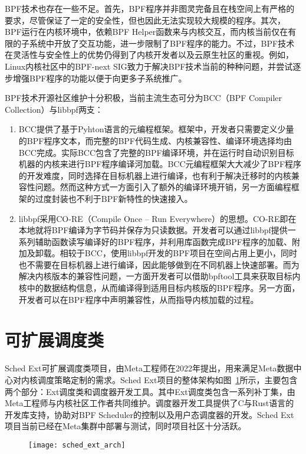 BPF技术也存在一些不足。首先，BPF程序并非图灵完备且在栈空间上有严格的要求，尽管保证了一定的安全性，但也因此无法实现较大规模的程序。其次，BPF运行在内核环境中，依赖BPF Helper函数来与内核交互，而内核当前仅在有限的子系统中开放了交互功能，进一步限制了BPF程序的能力。不过，BPF技术在灵活性与安全性上的优势仍得到了内核开发者以及云原生社区的重视。例如，Linux内核社区中的BPF-next SIG致力于解决BPF技术当前的种种问题，并尝试逐步增强BPF程序的功能以便于向更多子系统推广。

BPF技术开源社区维护十分积极，当前主流生态可分为BCC（BPF Compiler Collection）\citep{bcc}与libbpf\citep{libbpf}两支：

\begin{enumerate}
    \item BCC提供了基于Pyhton语言的元编程框架。框架中，开发者只需要定义少量的BPF程序文本，而完整的BPF代码生成、内核兼容性、编译环境选择均由BCC完成。实际BCC包含了完整的BPF编译环境，并在运行时自动识别目标机器的内核来进行BPF程序编译河加载。BCC元编程框架大大减少了BPF程序的开发难度，同时选择在目标机器上进行编译，也有利于解决迁移时的内核兼容性问题。然而这种方式一方面引入了额外的编译环境开销，另一方面编程框架的过度封装也不利于BPF新特性的快速接入。
    \item libbpf采用CO-RE（Compile Once – Run Everywhere）的思想。CO-RE即在本地就将BPF编译为字节码并保存为只读数据。开发者可以通过libbpf提供一系列辅助函数读写编译好的BPF程序，并利用库函数完成BPF程序的加载、附加及卸载。相较于BCC，使用libbpf开发的BPF项目在空间占用上更小，同时也不需要在目标机器上进行编译，因此能够做到在不同机器上快速部署。而为解决内核版本的兼容性问题，一方面开发者可以借助bpftool工具来获取目标内核中的数据结构信息，从而编译得到适用目标内核版的BPF程序。另一方面，开发者可以在BPF程序中声明兼容性，从而指导内核加载的过程。
\end{enumerate}

\section{可扩展调度类}

Sched Ext可扩展调度类项目\citep{schedext}，由Meta工程师在2022年提出，用来满足Meta数据中心对内核调度策略定制的需求。Sched Ext项目的整体架构如图~\ref{fig:sched_ext_arch}所示，主要包含两个部分：Ext调度类和调度器开发工具。其中Ext调度类包含一系列补丁集，由Meta工程师与内核社区工作者共同维护。调度器开发工具提供了C与Rust语言的开发库支持，协助对BPF Scheduler的控制以及用户态调度器的开发。Sched Ext项目当前已经在Meta集群中部署与测试，同时项目社区十分活跃。

\begin{figure}[!htbp]
    \centering
    \texttt{[image: sched\_ext\_arch]}
    \label{fig:sched_ext_arch}
\end{figure}

